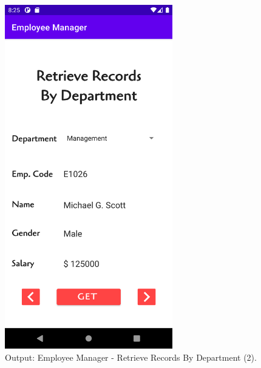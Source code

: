 \documentclass[12pt, a4]{article}
\begin{document}
\subsection*{}
\begin{figure}[h]
\centering
\caption{Output: Employee Manager - Retrieve Records By Department (2).}
\includegraphics[height=15cm, width=7.3cm]{EmployeeManager/Screenshots/Output-8.png}
\end{figure}


\newpage
\end{document}
